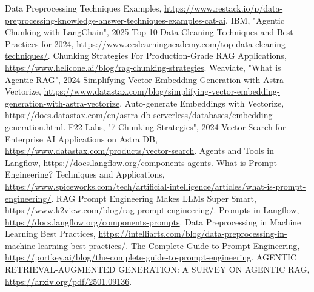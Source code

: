 \documentclass[conference]{IEEEtran}
\begin{document}
\begin{thebibliography}{00}
 Data Preprocessing Techniques Examples, \url{https://www.restack.io/p/data-preprocessing-knowledge-answer-techniques-examples-cat-ai}.
 IBM, "Agentic Chunking with LangChain", 2025
 Top 10 Data Cleaning Techniques and Best Practices for 2024, \url{https://www.ccslearningacademy.com/top-data-cleaning-techniques/}.
 Chunking Strategies For Production-Grade RAG Applications, \url{https://www.helicone.ai/blog/rag-chunking-strategies}.
 Weaviate, "What is Agentic RAG", 2024
 Simplifying Vector Embedding Generation with Astra Vectorize, \url{https://www.datastax.com/blog/simplifying-vector-embedding-generation-with-astra-vectorize}.
 Auto-generate Embeddings with Vectorize, \url{https://docs.datastax.com/en/astra-db-serverless/databases/embedding-generation.html}.
 F22 Labs, "7 Chunking Strategies", 2024
 Vector Search for Enterprise AI Applications on Astra DB, \url{https://www.datastax.com/products/vector-search}.
 Agents and Tools in Langflow, \url{https://docs.langflow.org/components-agents}.
 What is Prompt Engineering? Techniques and Applications, \url{https://www.spiceworks.com/tech/artificial-intelligence/articles/what-is-prompt-engineering/}.
 RAG Prompt Engineering Makes LLMs Super Smart, \url{https://www.k2view.com/blog/rag-prompt-engineering/}.
 Prompts in Langflow, \url{https://docs.langflow.org/components-prompts}.
 Data Preprocessing in Machine Learning Best Practices, \url{https://intelliarts.com/blog/data-preprocessing-in-machine-learning-best-practices/}.
 The Complete Guide to Prompt Engineering, \url{https://portkey.ai/blog/the-complete-guide-to-prompt-engineering}.
 AGENTIC RETRIEVAL-AUGMENTED GENERATION: A SURVEY ON
AGENTIC RAG, \url{https://arxiv.org/pdf/2501.09136}.
\end{thebibliography}
\end{document}
